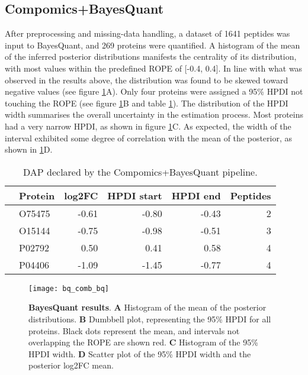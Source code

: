 \subsection{Compomics+BayesQuant}

After preprocessing and missing-data handling, a dataset of 1641 peptides was input to BayesQuant, and 269 proteins were quantified. A histogram of the mean of the inferred posterior distributions manifests the centrality of its distribution, with most values within the predefined \ac{ROPE} of [-0.4, 0.4]. In line with what was observed in the results above, the distribution was found to be skewed toward negative values (see figure \ref{fig:compomics_bq}A). Only four proteins were assigned a 95\% \ac{HPDI} not touching the \ac{ROPE} (see figure \ref{fig:compomics_bq}B and table \ref{tab:thp1_bq_results}). The distribution of the \ac{HPDI} width summarises the overall uncertainty in the estimation process. Most proteins had a very narrow HPDI, as shown in figure \ref{fig:compomics_bq}C. As expected, the width of the interval exhibited some degree of correlation with   the mean of the posterior, as shown in \ref{fig:compomics_bq}D.

\begin{table}[!h]
\centering
\begin{tabular}{rlrrrr}
  \hline
 & Protein & log2FC & HPDI start & HPDI end & Peptides \\ 
  \hline
& O75475 & -0.61 & -0.80 & -0.43 & 2 \\ 
   & O15144 & -0.75 & -0.98 & -0.51 & 3 \\ 
   & P02792 & 0.50 & 0.41 & 0.58 & 4 \\ 
   & P04406 & -1.09 & -1.45 & -0.77 & 4 \\ 
   \hline
\end{tabular}
\caption{\ac{DAP} declared by the Compomics+BayesQuant pipeline.}
\label{tab:thp1_bq_results}
\end{table}


\begin{figure}[H]
\centering
\texttt{[image: bq\_comb\_bq]}
\caption[Compomics+BayesQuant results on the THP-1 dataset]{\textbf{BayesQuant results}. \textbf{A} Histogram of the mean of the posterior distributions. \textbf{B} Dumbbell plot, representing the 95\% \ac{HPDI} for all proteins. Black dots represent the mean, and intervals not overlapping the \ac{ROPE} are shown red. \textbf{C} Histogram of the 95\% \ac{HPDI} width. \textbf{D} Scatter plot of the 95\% \ac{HPDI} width and the  posterior \ac{log2FC} mean.}
\label{fig:compomics_bq}
\end{figure}


